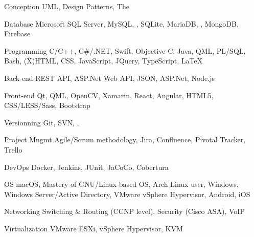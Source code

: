 

\begin{cvskills}

  \cvskill
    {Conception} %
    {UML, Design Patterns, The } %

  \cvskill
    {Database} %
    {Microsoft SQL Server, MySQL, , SQLite, MariaDB, , MongoDB, Firebase} %

  \cvskill
    {Programming} %
    {C/C++, C\#/.NET, Swift, Objective-C, Java, QML, PL/SQL, Bash, (X)HTML, CSS, JavaScript, JQuery, TypeScript, \LaTeX} %

  \cvskill
    {Back-end} %
    {REST API, ASP.Net Web API, JSON, ASP.Net, Node.js} %

  \cvskill
    {Front-end} %
    {Qt, QML, OpenCV, Xamarin, React, Angular, HTML5, CSS/LESS/Sass, Bootstrap} %

  \cvskill
    {Versionning} %
    {Git, SVN, , } %

  \cvskill
    {Project Mngmt} %
    {Agile/Scrum methodology, Jira, Confluence, Pivotal Tracker, Trello} %

  \cvskill
    {DevOps} %
    {Docker, Jenkins, JUnit, JaCoCo, Cobertura} %

  \cvskill
    {OS} %
    {macOS, Mastery of GNU/Linux-based OS, Arch Linux user, Windows, Windows Server/Active Directory, VMware vSphere Hypervisor, Android, iOS} %

  \cvskill
    {Networking} %
    {Switching \& Routing (CCNP level), Security (Cisco ASA), VoIP} %

  \cvskill
    {Virtualization} %
    {VMware ESXi, vSphere Hypervisor, KVM} %


\end{cvskills}

